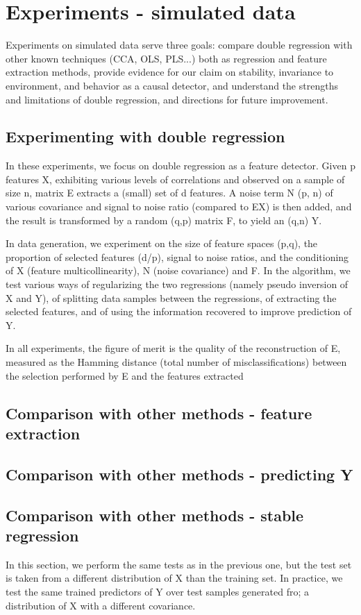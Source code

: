 \documentclass{article}
\begin{document}
\section{Experiments - simulated data}
Experiments on simulated data serve three goals: compare double regression with other known techniques (CCA, OLS, PLS...) both as regression and feature extraction methods, provide evidence for our claim on stability, invariance to environment, and behavior as a causal detector, and understand the strengths and limitations of double regression, and directions for future improvement.

\subsection{Experimenting with double regression}
In these experiments, we focus on double regression as a feature detector. Given p features X, exhibiting various levels of correlations and observed on a sample of size n, matrix E extracts a (small) set of d features. A noise term N (p, n) of various covariance and signal to noise ratio (compared to EX) is then added, and the result is transformed by a random (q,p) matrix F, to yield an (q,n) Y.

In data generation, we experiment on the size of feature spaces (p,q), the proportion of selected features (d/p), signal to noise ratios, and the conditioning of X (feature multicollinearity), N (noise covariance) and F. In the algorithm, we test various ways of regularizing the two regressions (namely pseudo inversion of X and Y), of splitting data samples between the regressions, of extracting the selected features, and of using the information recovered to improve prediction of Y.

In all experiments, the figure of merit is the quality of the reconstruction of E, measured as the Hamming distance (total number of misclassifications) between the selection performed by E and the features extracted 

\subsection{Comparison with other methods - feature extraction}

\subsection{Comparison with other methods - predicting Y}

\subsection{Comparison with other methods - stable regression}
In this section, we perform the same tests as in the previous one, but the test set is taken from a different distribution of X than the training set. In practice, we test the same trained predictors of Y over test samples generated fro; a distribution of X with a different covariance.
\end{document}
